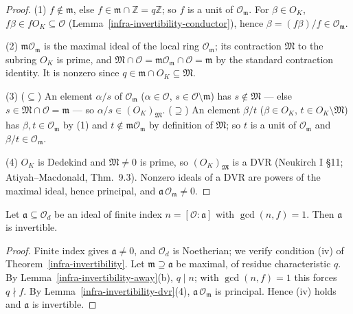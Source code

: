 \begin{proof}
  (1) $f \notin \mathfrak{m}$, else
  $f \in \mathfrak{m} \cap \mathbb{Z} = q\mathbb{Z}$; so $f$ is a unit of
  $\mathcal{O}_{\mathfrak{m}}$. For $\beta \in O_K$,
  $f\beta \in f O_K \subseteq \mathcal{O}$
  (Lemma~\ref{infra-invertibility-conductor}), hence
  $\beta = (f\beta)/f \in \mathcal{O}_{\mathfrak{m}}$.

  (2) $\mathfrak{m}\mathcal{O}_{\mathfrak{m}}$ is the maximal ideal of the
  local ring $\mathcal{O}_{\mathfrak{m}}$; its contraction $\mathfrak{M}$ to
  the subring $O_K$ is prime, and
  $\mathfrak{M} \cap \mathcal{O}
    = \mathfrak{m}\mathcal{O}_{\mathfrak{m}} \cap \mathcal{O} = \mathfrak{m}$
  by the standard contraction identity. It is nonzero since
  $q \in \mathfrak{m} \cap O_K \subseteq \mathfrak{M}$.

  (3) ($\subseteq$) An element $\alpha/s$ of $\mathcal{O}_{\mathfrak{m}}$
  ($\alpha \in \mathcal{O}$, $s \in \mathcal{O} \setminus \mathfrak{m}$) has
  $s \notin \mathfrak{M}$ — else $s \in \mathfrak{M} \cap \mathcal{O} = \mathfrak{m}$ —
  so $\alpha/s \in (O_K)_{\mathfrak{M}}$.
  ($\supseteq$) An element $\beta/t$ ($\beta \in O_K$,
  $t \in O_K \setminus \mathfrak{M}$) has $\beta, t \in \mathcal{O}_{\mathfrak{m}}$
  by (1) and $t \notin \mathfrak{m}\mathcal{O}_{\mathfrak{m}}$ by definition of
  $\mathfrak{M}$; so $t$ is a unit of $\mathcal{O}_{\mathfrak{m}}$ and
  $\beta/t \in \mathcal{O}_{\mathfrak{m}}$.

  (4) $O_K$ is Dedekind and $\mathfrak{M} \neq 0$ is prime, so
  $(O_K)_{\mathfrak{M}}$ is a DVR (Neukirch I \S 11; Atiyah--Macdonald,
  Thm.\ 9.3). Nonzero ideals of a DVR are powers of the maximal ideal, hence
  principal, and $\mathfrak{a}\,\mathcal{O}_{\mathfrak{m}} \neq 0$.
\end{proof}

\begin{theorem}
  \label{infra-invertibility-coprime}
  Let $\mathfrak{a} \subseteq \mathcal{O}_d$ be an ideal of finite index
  $n = [\mathcal{O} : \mathfrak{a}]$ with $\gcd(n, f) = 1$. Then $\mathfrak{a}$
  is invertible.
\end{theorem}

\begin{proof}
  Finite index gives $\mathfrak{a} \neq 0$, and $\mathcal{O}_d$ is Noetherian;
  we verify condition (iv) of Theorem~\ref{infra-invertibility}. Let
  $\mathfrak{m} \supseteq \mathfrak{a}$ be maximal, of residue characteristic
  $q$. By Lemma~\ref{infra-invertibility-away}(b), $q \mid n$; with
  $\gcd(n, f) = 1$ this forces $q \nmid f$. By
  Lemma~\ref{infra-invertibility-dvr}(4),
  $\mathfrak{a}\,\mathcal{O}_{\mathfrak{m}}$ is principal. Hence (iv) holds and
  $\mathfrak{a}$ is invertible.
\end{proof}

